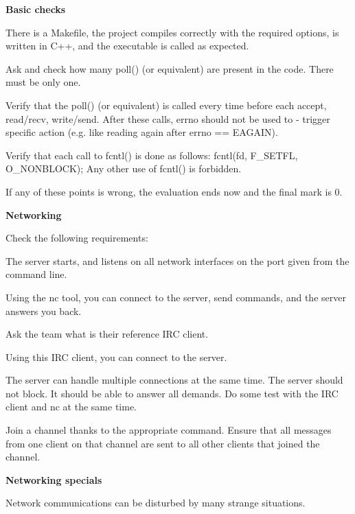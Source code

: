 {\bfseries{Basic checks}}


\begin{DoxyItemize}
\item There is a Makefile, the project compiles correctly with the required options, is written in C++, and the executable is called as expected.
\item Ask and check how many poll() (or equivalent) are present in the code. There must be only one.
\item Verify that the poll() (or equivalent) is called every time before each accept, read/recv, write/send. After these calls, errno should not be used to -\/ trigger specific action (e.\+g. like reading again after errno == EAGAIN).
\item Verify that each call to fcntl() is done as follows\+: fcntl(fd, F\+\_\+\+SETFL, O\+\_\+\+NONBLOCK); Any other use of fcntl() is forbidden.
\item If any of these points is wrong, the evaluation ends now and the final mark is 0.
\end{DoxyItemize}

{\bfseries{Networking}}

Check the following requirements\+:


\begin{DoxyItemize}
\item The server starts, and listens on all network interfaces on the port given from the command line.
\item Using the \textquotesingle{}nc\textquotesingle{} tool, you can connect to the server, send commands, and the server answers you back.
\item Ask the team what is their reference IRC client.
\item Using this IRC client, you can connect to the server.
\item The server can handle multiple connections at the same time. The server should not block. It should be able to answer all demands. Do some test with the IRC client and nc at the same time.
\item Join a channel thanks to the appropriate command. Ensure that all messages from one client on that channel are sent to all other clients that joined the channel.
\end{DoxyItemize}

{\bfseries{Networking specials}}

Network communications can be disturbed by many strange situations.


